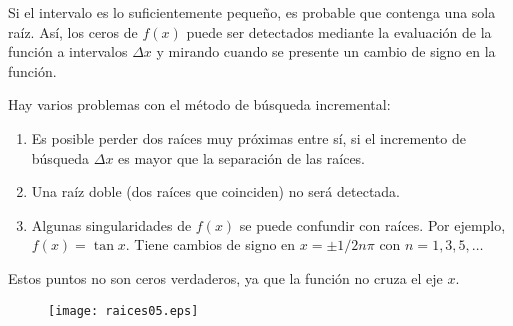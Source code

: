 \begin{frame}
Si el intervalo es lo suficientemente pequeño, es probable que contenga una sola raíz. Así, los ceros de $f(x)$ puede ser detectados mediante la evaluación de la función a intervalos $\Delta x$ y mirando cuando se presente un cambio de signo en la función.
\end{frame}
\begin{frame}
Hay varios problemas con el método de búsqueda incremental:
\begin{enumerate}
\item Es posible perder dos raíces muy próximas entre sí, si el incremento de búsqueda $\Delta x$ es mayor que la separación de las raíces.
\item Una raíz doble (dos raíces que coinciden) no será detectada.
\item Algunas singularidades de $f(x)$ se puede confundir con raíces. Por ejemplo, $f(x) = \tan x$. Tiene cambios de signo en $x = \pm 1/2 n\pi$ con $n = 1, 3, 5,\ldots$
\end{enumerate}
\end{frame}
\begin{frame}
Estos puntos no son ceros verdaderos, ya que la función no cruza el eje $x$.
\begin{figure}
	\centering
	\texttt{[image: raices05.eps]} 
\end{figure}
\end{frame}
